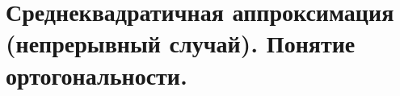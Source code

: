 \documentclass[../../calc-math-exam-2023.tex]{subfiles}
\begin{document}
    \section{Среднеквадратичная аппроксимация (непрерывный случай). Понятие ортогональности.}\label{sec:ch14}
\end{document}
